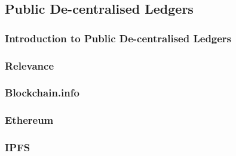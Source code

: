 \subsection{Public De-centralised Ledgers}

\subsubsection{Introduction to Public De-centralised Ledgers}

\subsubsection{Relevance}

\subsubsection{Blockchain.info}

\subsubsection{Ethereum}

\subsubsection{IPFS}
